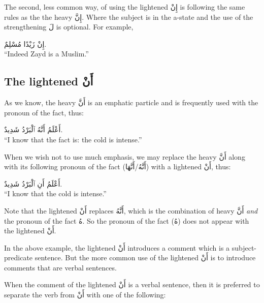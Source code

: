 \documentclass[
  10pt,
]{book}
\begin{document}
The second, less common way, of using
the lightened \foreignlanguage{arabic}{إِنْ}
is following the same rules as the
the heavy \foreignlanguage{arabic}{إِنَّ}.
Where the subject is in the a-state and the use of the strengthening \foreignlanguage{arabic}{لَ} is optional. For example,

\foreignlanguage{arabic}{إِنْ زَيْدًا مُسْلِمٌ.}\\
\enquote{Indeed Zayd is a Muslim.}

\subsection{\texorpdfstring{The lightened \foreignlanguage{arabic}{أَنْ}}{The lightened أَنْ}}\label{lightened-an}

As we know, the heavy \foreignlanguage{arabic}{أَنَّ} is an emphatic particle and is frequently used with the pronoun of the fact, thus:

\foreignlanguage{arabic}{أَعْلَمُ أَنَّهُ ٱلْبَرْدُ شَدِيدٌ.}\\
\enquote{I know that the fact is: the cold is intense.}

When we wish not to use much emphasis, we may replace
the heavy \foreignlanguage{arabic}{أَنَّ} along with its following pronoun of the fact (\foreignlanguage{arabic}{أَنَّهُ}/\foreignlanguage{arabic}{أَنَّهَا}) with
a lightened \foreignlanguage{arabic}{أَنْ}, thus:

\foreignlanguage{arabic}{أَعْلَمُ أَنِ ٱلْبَرْدُ شَدِيدٌ.}\\
\enquote{I know that the cold is intense.}

Note that
the lightened \foreignlanguage{arabic}{أَنْ} replaces
\foreignlanguage{arabic}{أَنَّهُ},
which is the combination of
heavy \foreignlanguage{arabic}{أَنَّ} \emph{and} the pronoun of the fact \foreignlanguage{arabic}{هُ}.
So the pronoun of the fact (\foreignlanguage{arabic}{هُ}) does not appear with
the lightened \foreignlanguage{arabic}{أَنْ}.

In the above example,
the lightened \foreignlanguage{arabic}{أَنْ}
introduces a comment which is a subject-predicate sentence.
But the more common use of
the lightened \foreignlanguage{arabic}{أَنْ}
is to introduce comments that are verbal sentences.

When the comment of the
lightened \foreignlanguage{arabic}{أَنْ}
is a verbal sentence, then it is preferred to separate the verb from \foreignlanguage{arabic}{أَنْ} with one of the following:
\end{document}
